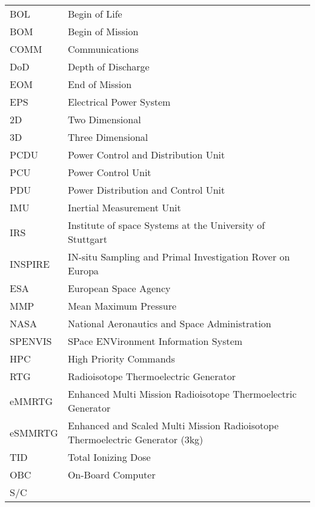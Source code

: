 \begin{longtable}[l]{ll}


BOL     & Begin of Life \\
BOM     & Begin of Mission \\
COMM    & Communications \\
DoD     & Depth of Discharge \\
EOM     & End of Mission \\
EPS     & Electrical Power System \\
2D		& Two Dimensional \\
3D		& Three Dimensional \\
PCDU    & Power Control and Distribution Unit \\
PCU     & Power Control Unit \\
PDU     & Power Distribution and Control Unit \\
IMU     & Inertial Measurement Unit \\
IRS     & Institute of space Systems at the University of Stuttgart \\
INSPIRE & IN-situ Sampling and Primal Investigation Rover on Europa \\
ESA		&	European Space Agency	\\
MMP		& Mean Maximum Pressure \\
NASA    &   National Aeronautics and Space Administration \\
SPENVIS	&	SPace ENVironment Information System	\\
HPC     & High Priority Commands \\
RTG     & Radioisotope Thermoelectric Generator \\
eMMRTG  & Enhanced Multi Mission Radioisotope Thermoelectric Generator \\
eSMMRTG & Enhanced and Scaled Multi Mission Radioisotope Thermoelectric Generator (3kg) \\
TID		& Total Ionizing Dose \\
OBC		& On-Board Computer \\
S/C     



\end{longtable}

\cleardoublepage






